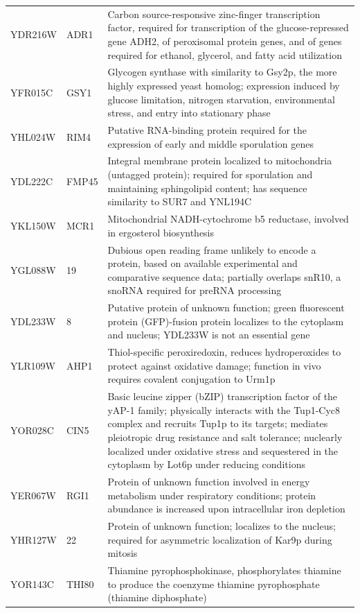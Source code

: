 \documentclass[letter]{article}\usepackage{graphicx, color}
\begin{document}
\begin{longtable}{lll}
  YDR216W & ADR1 & Carbon source-responsive zinc-finger transcription factor, required for transcription of the glucose-repressed gene ADH2, of peroxisomal protein genes, and of genes required for ethanol, glycerol, and fatty acid utilization \\ 
  YFR015C & GSY1 & Glycogen synthase with similarity to Gsy2p, the more highly expressed yeast homolog; expression induced by glucose limitation, nitrogen starvation, environmental stress, and entry into stationary phase \\ 
  YHL024W & RIM4 & Putative RNA-binding protein required for the expression of early and middle sporulation genes \\ 
  YDL222C & FMP45 & Integral membrane protein localized to mitochondria (untagged protein); required for sporulation and maintaining sphingolipid content; has sequence similarity to SUR7 and YNL194C \\ 
  YKL150W & MCR1 & Mitochondrial NADH-cytochrome b5 reductase, involved in ergosterol biosynthesis \\ 
  YGL088W & 19 & Dubious open reading frame unlikely to encode a protein, based on available experimental and comparative sequence data; partially overlaps snR10, a snoRNA required for preRNA processing \\ 
  YDL233W & 8 & Putative protein of unknown function; green fluorescent protein (GFP)-fusion protein localizes to the cytoplasm and nucleus; YDL233W is not an essential gene \\ 
  YLR109W & AHP1 & Thiol-specific peroxiredoxin, reduces hydroperoxides to protect against oxidative damage; function in vivo requires covalent conjugation to Urm1p \\ 
  YOR028C & CIN5 & Basic leucine zipper (bZIP) transcription factor of the yAP-1 family; physically interacts with the Tup1-Cyc8 complex and recruits Tup1p to its targets; mediates pleiotropic drug resistance and salt tolerance; nuclearly localized under oxidative stress and sequestered in the cytoplasm by Lot6p under reducing conditions \\ 
  YER067W & RGI1 & Protein of unknown function involved in energy metabolism under respiratory conditions; protein abundance is increased upon intracellular iron depletion \\ 
  YHR127W & 22 & Protein of unknown function; localizes to the nucleus; required for asymmetric localization of Kar9p during mitosis \\ 
  YOR143C & THI80 & Thiamine pyrophosphokinase, phosphorylates thiamine to produce the coenzyme thiamine pyrophosphate (thiamine diphosphate) \\ 

\end{longtable}
\end{document}

